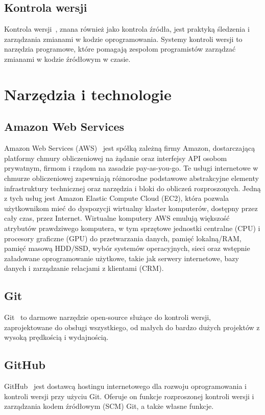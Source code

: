 	\subsection{Kontrola wersji}
	Kontrola wersji~\cite{version_control}, znana również jako kontrola źródła, jest praktyką śledzenia i zarządzania zmianami w kodzie oprogramowania. Systemy kontroli wersji to narzędzia programowe, które pomagają zespołom programistów zarządzać zmianami w kodzie źródłowym w czasie.


\section{Narzędzia i technologie}
	\subsection{Amazon Web Services}
	Amazon Web Services (AWS)~\cite{aws} jest spółką zależną firmy Amazon, dostarczającą platformy chmury obliczeniowej na żądanie oraz interfejsy API osobom prywatnym, firmom i rządom na zasadzie pay-as-you-go. Te usługi internetowe w chmurze obliczeniowej zapewniają różnorodne podstawowe abstrakcyjne elementy infrastruktury technicznej oraz narzędzia i bloki do obliczeń rozproszonych. Jedną z tych usług jest Amazon Elastic Compute Cloud (EC2), która pozwala użytkownikom mieć do dyspozycji wirtualny klaster komputerów, dostępny przez cały czas, przez Internet. Wirtualne komputery AWS emulują większość atrybutów prawdziwego komputera, w tym sprzętowe jednostki centralne (CPU) i procesory graficzne (GPU) do przetwarzania danych, pamięć lokalną/RAM, pamięć masową HDD/SSD, wybór systemów operacyjnych, sieci oraz wstępnie załadowane oprogramowanie użytkowe, takie jak serwery internetowe, bazy danych i zarządzanie relacjami z klientami (CRM).
	
	\subsection{Git}
	Git~\cite{git} to darmowe narzędzie open-source służące do kontroli wersji, zaprojektowane do obsługi wszystkiego, od małych do bardzo dużych projektów z wysoką prędkością i wydajnością.	
	
	\subsection{GitHub}
	GitHub~\cite{github} jest dostawcą hostingu internetowego dla rozwoju oprogramowania i kontroli wersji przy użyciu Git. Oferuje on funkcje rozproszonej kontroli wersji i zarządzania kodem źródłowym (SCM) Git, a także własne funkcje.
	
